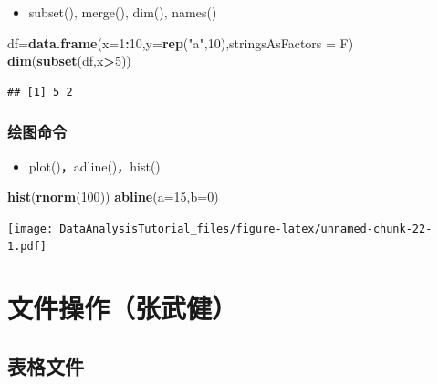 \documentclass[]{book}
\newenvironment{Shaded}{\begin{snugshade}}{\end{snugshade}}
\newcommand{\DataTypeTok}[1]{\textcolor[rgb]{0.13,0.29,0.53}{#1}}
\newcommand{\DecValTok}[1]{\textcolor[rgb]{0.00,0.00,0.81}{#1}}
\newcommand{\KeywordTok}[1]{\textcolor[rgb]{0.13,0.29,0.53}{\textbf{#1}}}
\newcommand{\NormalTok}[1]{#1}
\newcommand{\OperatorTok}[1]{\textcolor[rgb]{0.81,0.36,0.00}{\textbf{#1}}}
\newcommand{\StringTok}[1]{\textcolor[rgb]{0.31,0.60,0.02}{#1}}
\providecommand{\tightlist}{%
  \setlength{\itemsep}{0pt}\setlength{\parskip}{0pt}}
\begin{document}
\begin{itemize}
\tightlist
\item
  subset(), merge(), dim(), names()
\end{itemize}

\begin{Shaded}
\begin{Highlighting}[]
\NormalTok{df=}\KeywordTok{data.frame}\NormalTok{(}\DataTypeTok{x=}\DecValTok{1}\OperatorTok{:}\DecValTok{10}\NormalTok{,}\DataTypeTok{y=}\KeywordTok{rep}\NormalTok{(}\StringTok{"a"}\NormalTok{,}\DecValTok{10}\NormalTok{),}\DataTypeTok{stringsAsFactors =}\NormalTok{ F)}
\KeywordTok{dim}\NormalTok{(}\KeywordTok{subset}\NormalTok{(df,x}\OperatorTok{>}\DecValTok{5}\NormalTok{))}
\end{Highlighting}
\end{Shaded}

\begin{verbatim}
## [1] 5 2
\end{verbatim}

\hypertarget{section-14}{%
\subsection{绘图命令}\label{section-14}}

\begin{itemize}
\tightlist
\item
  plot()，adline()，hist()
\end{itemize}

\begin{Shaded}
\begin{Highlighting}[]
\KeywordTok{hist}\NormalTok{(}\KeywordTok{rnorm}\NormalTok{(}\DecValTok{100}\NormalTok{))}
\KeywordTok{abline}\NormalTok{(}\DataTypeTok{a=}\DecValTok{15}\NormalTok{,}\DataTypeTok{b=}\DecValTok{0}\NormalTok{)}
\end{Highlighting}
\end{Shaded}

\texttt{[image: DataAnalysisTutorial\_files/figure-latex/unnamed-chunk-22-1.pdf]}

\hypertarget{section-15}{%
\chapter{文件操作（张武健）}\label{section-15}}

\hypertarget{section-16}{%
\section{表格文件}\label{section-16}}
\end{document}

